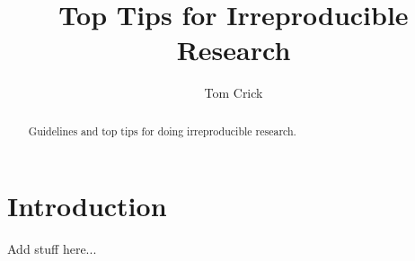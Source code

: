 \documentclass[a4paper,11pt]{article}
\title{Top Tips for Irreproducible Research}
\author[1]{Tom Crick}
\affil[1]{Department of Computing \& Information Systems, Cardiff
  Metropolitan University}
\affil[1]{\protect\url{tcrick@cardiffmet.ac.uk}}
\date{ }
\begin{document}
\maketitle

\begin{abstract}
Guidelines and top tips for doing irreproducible research.
\end{abstract}

\section{Introduction}
Add stuff here...

%
%
\end{document}
